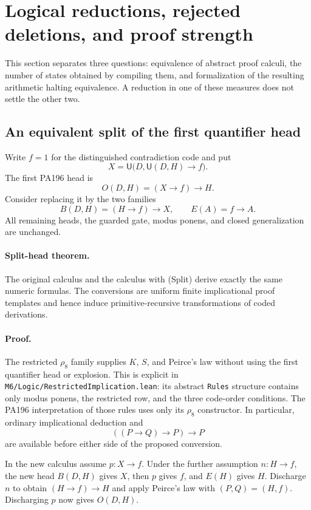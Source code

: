 \section{Logical reductions, rejected deletions, and proof strength}
\label{sec:logical-audit}

This section separates three questions: equivalence of abstract proof
calculi, the number of states obtained by compiling them, and formalization
of the resulting arithmetic halting equivalence.  A reduction in one of
these measures does not settle the other two.

\subsection{An equivalent split of the first quantifier head}

Write $f=1$ for the distinguished contradiction code and put
\[
 X=\mathsf U\bigl(D,\mathsf U(D,H)\to f\bigr).
\]
The first PA196 head is
\[
 O(D,H)=(X\to f)\to H.
\]
Consider replacing it by the two families
\[
 B(D,H)=(H\to f)\to X,
 \qquad E(A)=f\to A.
 \tag{Split}
\]
All remaining heads, the guarded gate, modus ponens, and closed
generalization are unchanged.

\paragraph{Split-head theorem.}
The original calculus and the calculus with \textup{(Split)} derive exactly
the same numeric formulas.  The conversions are uniform finite
implicational proof templates and hence induce primitive-recursive
transformations of coded derivations.

\paragraph{Proof.}
The restricted $\rho_8$ family supplies $K$, $S$, and Peirce's law without
using the first quantifier head or explosion.  This is explicit in
\texttt{M6/Logic/RestrictedImplication.lean}: its abstract \texttt{Rules}
structure contains only modus ponens, the restricted row, and the three
code-order conditions.  The PA196 interpretation of those rules uses only
its $\rho_8$ constructor.  In particular, ordinary implicational deduction
and
\[
 ((P\to Q)\to P)\to P
\]
are available before either side of the proposed conversion.

In the new calculus assume $p:X\to f$.  Under the further assumption
$n:H\to f$, the new head $B(D,H)$ gives $X$, then $p$ gives $f$, and
$E(H)$ gives $H$.  Discharge $n$ to obtain $(H\to f)\to H$ and apply
Peirce's law with $(P,Q)=(H,f)$.  Discharging $p$ now gives $O(D,H)$.

